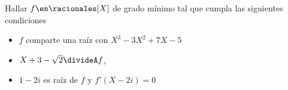 \begin{enunciado}{\ejExtra}
        Hallar $f \en \racionales[X]$ de grado mínimo tal que cumpla las siguientes condiciones
	\begin{itemize}
		\item $f$ comparte una raíz con $X^3 - 3X^2 + 7X -5$
        \item $X+3-\sqrt{2} \divideA f$,
        \item $1-2 i$ es raíz de $f$ y $f'(X-2i) = 0$
	\end{itemize}
\end{enunciado}
\hacer
